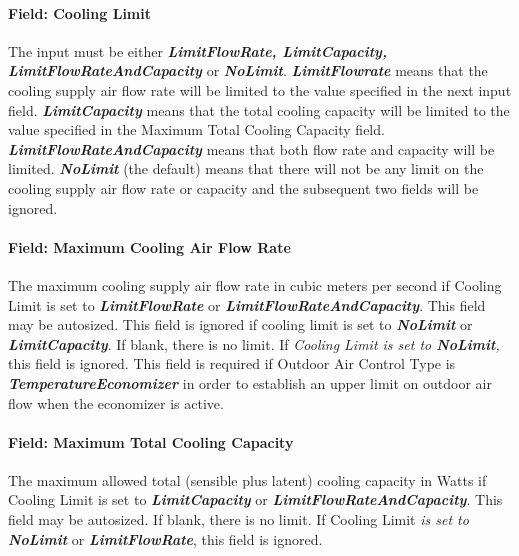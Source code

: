 \paragraph{Field: Cooling Limit}\label{field-cooling-limit-000}

The input must be either \textbf{\emph{LimitFlowRate, LimitCapacity, LimitFlowRateAndCapacity}} or \textbf{\emph{NoLimit}}. \textbf{\emph{LimitFlowrate}} means that the cooling supply air flow rate will be limited to the value specified in the next input field. \textbf{\emph{LimitCapacity}} means that the total cooling capacity will be limited to the value specified in the Maximum Total Cooling Capacity field. \textbf{\emph{LimitFlowRateAndCapacity}} means that both flow rate and capacity will be limited. \textbf{\emph{NoLimit}} (the default) means that there will not be any limit on the cooling supply air flow rate or capacity and the subsequent two fields will be ignored.

\paragraph{Field: Maximum Cooling Air Flow Rate}\label{field-maximum-cooling-air-flow-rate-001}

The maximum cooling supply air flow rate in cubic meters per second if Cooling Limit is set to \textbf{\emph{LimitFlowRate}} or \textbf{\emph{LimitFlowRateAndCapacity}}. This field may be autosized. This field is ignored if cooling limit is set to \textbf{\emph{NoLimit}} or \textbf{\emph{LimitCapacity}}. If blank, there is no limit. If \emph{Cooling Limit is set to \textbf{NoLimit},} this field is ignored. This field is required if Outdoor Air Control Type is \textbf{\emph{TemperatureEconomizer}} in order to establish an upper limit on outdoor air flow when the economizer is active.

\paragraph{Field: Maximum Total Cooling Capacity}\label{field-maximum-total-cooling-capacity-000}

The maximum allowed total (sensible plus latent) cooling capacity in Watts if Cooling Limit is set to \textbf{\emph{LimitCapacity}} or \textbf{\emph{LimitFlowRateAndCapacity}}. This field may be autosized. If blank, there is no limit. If Cooling Limit \emph{is set to \textbf{NoLimit}} or \emph{\textbf{LimitFlowRate}}, this field is ignored.

